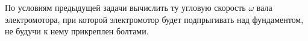 По условиям предыдущей задачи вычислить ту угловую скорость $\omega$ вала электромотора, при которой электромотор будет подпрыгивать над фундаментом, не будучи к нему прикреплен
болтами.
